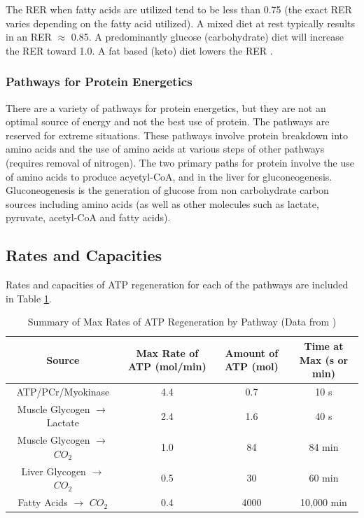 The RER when fatty acids are utilized tend to be less than 0.75 (the exact RER varies depending on the fatty acid utilized). A mixed diet at rest typically results in an RER $\approx$ 0.85. A predominantly glucose (carbohydrate) diet will increase the RER toward 1.0. A fat based (keto) diet lowers the RER \cite{alessandro_effects_2015}.

\subsubsection{Pathways for Protein Energetics}

There are a variety of pathways for protein energetics, but they are not an optimal source of energy and not the best use of protein. The pathways are reserved for extreme situations. These pathways involve protein breakdown into amino acids and the use of amino acids at various steps of other pathways (requires removal of nitrogen). The two primary paths for protein involve the use of amino acids to produce acyetyl-CoA, and in the liver for gluconeogenesis. Gluconeogenesis is the generation of glucose from non carbohydrate carbon sources including amino acids (as well as other molecules such as lactate, pyruvate, acetyl-CoA and fatty acids).

\subsection{Rates and Capacities}

Rates and capacities of ATP regeneration for each of the pathways are included in Table \ref{table:ATP_Rates}.

\begin{table}[h!]
\centering
\begin{tabular}{||c c c c||} 
 \hline
Source & Max Rate of ATP (mol/min) & Amount of ATP (mol) & Time at Max (s or min)\\ [0.5ex] 
 \hline\hline
 ATP/PCr/Myokinase & 4.4  & 0.7 & 10 s \\
 Muscle Glycogen $\rightarrow$ Lactate &  2.4 & 1.6 & 40 s \\ 
 Muscle Glycogen $\rightarrow$ $CO_2$ & 1.0 & 84 & 84 min\\
 Liver Glycogen $\rightarrow$ $CO_2$  & 0.5 & 30 & 60 min \\ 
 Fatty Acids $\rightarrow$ $CO_2$ & 0.4 & 4000 & 10,000 min \\[1ex] 
 \hline
\end{tabular}
\caption{Summary of Max Rates of ATP Regeneration by Pathway (\footnotesize{Data from \cite{feher_quantitative_2017}})}
\label{table:ATP_Rates}
\end{table}

